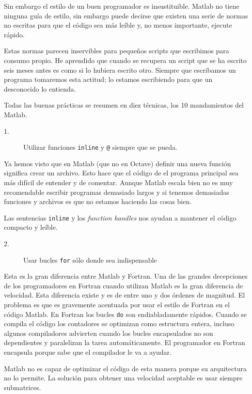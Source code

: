 Sin embargo el estilo de un buen programador es insustituible. Matlab
no tiene ninguna guía de estilo, sin embargo puede decirse que existen
una serie de normas no escritas para que el código sea más leíble y,
no menos importante, ejecute rápido.

Estas normas parecen inservibles para pequeños scripts que escribimos
para consumo propio. He aprendido que cuando se recupera un script que
se ha escrito seis meses antes es como si lo hubiera escrito otro.
Siempre que escribamos un programa tomaremos esta actitud; lo estamos
escribiendo para que un desconocido lo entienda.

Todas las buenas prácticas se resumen en diez técnicas, los 10
mandamientos del Matlab.

\begin{description}
\item [1.]Utilizar funciones \texttt{inline} y \texttt{@} siempre que
  se pueda.
\end{description}
Ya hemos visto que en Matlab (que no en Octave) definir una nueva
función significa crear un archivo. Esto hace que el código de el
programa principal sea más difícil de entender y de comentar. Aunque
Matlab escala bien no es muy recomendable escribir programas demasiado
largos y si tenemos demasiadas funciones y archivos es que no estamos
haciendo las cosas bien.

Las sentencias \texttt{inline} y los \emph{function handles} nos
ayudan a mantener el código compacto y leíble.

\begin{description}
\item [2.]Usar bucles \texttt{for} sólo donde sea indispensable
\end{description}
Esta es la gran diferencia entre Matlab y Fortran. Una de las grandes
decepciones de los programadores en Fortran cuando utilizan Matlab es
la gran diferencia de velocidad. Esta diferencia existe y es de entre
uno y dos órdenes de magnitud. El problema es que es gravemente
acentuada por usar el estilo de Fortran en el código Matlab. En
Fortran los bucles \texttt{do} son endiabladamente rápidos. Cuando se
compila el código los contadores se optimizan como estructura entera,
incluso algunos compiladores advierten cuando los bucles encapsulados
no son dependientes y paralelizan la tarea automáticamente. El
programador en Fortran encapsula porque sabe que el compilador le va a
ayudar.

Matlab no es capaz de optimizar el código de esta manera porque su
arquitectura no lo permite. La solución para obtener una velocidad
aceptable es usar siempre submatrices.

